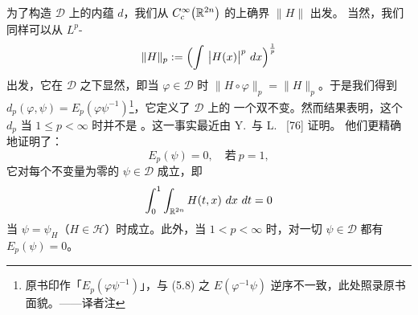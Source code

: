 为了构造 $\mathcal{D}$ 上的内蕴\trBiInvariantMetric{} $d$，我们从%
$C^{\infty}_{c}\bigl(\mathbb{R}^{2n}\bigr)$ 的上确界\trNorm{} $\lVert H\rVert$ 出发。%
当然，我们同样可以从 $L^{p}$-\trNorm
\[
\lVert H\rVert_{p}:=\Bigl(\int\ \bigl\lvert H(x)\bigr\rvert^{p}\ dx\Bigr)^{\frac{1}{p}}
\]
出发，它在 $\mathcal{D}$ 之下显然\trInvariant，即当 $\varphi\in\mathcal{D}$ 时%
$\lVert H\circ\varphi\rVert_{p}=\lVert H\rVert_{p}$。于是我们得到%
$d_{p}(\varphi,\psi)=E_{p}(\varphi\psi^{-1})$\footnote{原书印作「$E_{p}(\varphi\psi^{-1})$」，与 (5.8) 之 $E(\varphi^{-1}\psi)$ 逆序不一致，此处照录原书面貌。——译者注}，它定义了 $\mathcal{D}$ 上的%
一个双不变\trPseudoMetric。然而结果表明，这个 $d_{p}$ 当 $1\leq p<\infty$ 时并不是%
\trMetric。这一事实最近由 Y.~\trEliashberg{}与 L.~\trPolterovich{} [76] 证明。%
他们更精确地证明了：
\[
E_{p}(\psi)=0,\quad\text{若}\ p=1,
\]
它对每个\trCalabi{}不变量为零的 $\psi\in\mathcal{D}$ 成立，即
\[
\int_{0}^{1}\int_{\R^{2n}}H(t,x)\ dx\ dt=0
\]
当 $\psi=\psi_{H}$（$H\in\mathcal{H}$）时成立。此外，当 $1<p<\infty$ 时，对一切%
$\psi\in\mathcal{D}$ 都有 $E_{p}(\psi)=0$。
